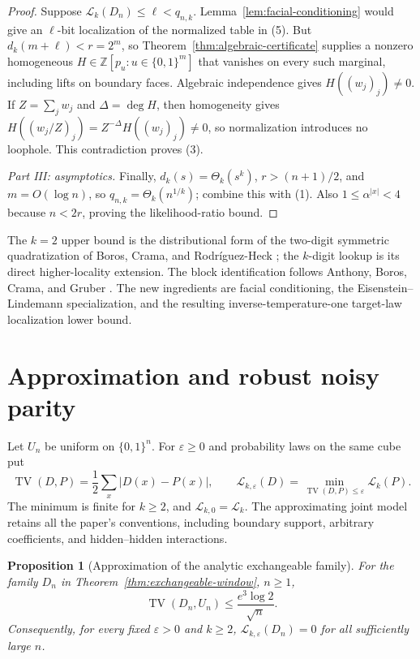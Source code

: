 \documentclass{article}
\newcommand{\LC}{\mathcal{L}}
\newcommand{\bits}{\{0,1\}}
\newtheorem{proposition}{Proposition}
\begin{document}
\begin{proof}
Suppose $\LC_k(D_n)\le\ell<q_{n,k}$.  Lemma~\ref{lem:facial-conditioning}
would give an $\ell$-bit localization of the normalized table in (5).  But
$d_k(m+\ell)<r=2^m$, so
Theorem~\ref{thm:algebraic-certificate} supplies a nonzero homogeneous
$H\in\mathbb Z[p_u:u\in\bits^m]$ that vanishes on every such marginal,
including lifts on boundary faces.  Algebraic independence gives
$H((w_j)_j)\ne0$.  If $Z=\sum_jw_j$ and $\Delta=\deg H$, then homogeneity gives
$H((w_j/Z)_j)=Z^{-\Delta}H((w_j)_j)\ne0$, so normalization introduces no
loophole.
This contradiction proves (3).

\emph{Part III: asymptotics.}
Finally, $d_k(s)=\Theta_k(s^k)$, $r>(n+1)/2$, and $m=O(\log n)$, so
$q_{n,k}=\Theta_k(n^{1/k})$; combine this with (1).  Also
$1\le\alpha^{|x|}<4$ because $n<2r$, proving the likelihood-ratio bound.
\end{proof}

The $k=2$ upper bound is the distributional form of the two-digit symmetric
quadratization of Boros, Crama, and Rodr\'iguez-Heck
\cite[Theorem~6]{bcrh20}; the $k$-digit lookup is its direct higher-locality
extension.  The block identification follows Anthony, Boros, Crama, and
Gruber \cite[Lemma~5.1]{anthony16}.  The new ingredients are facial
conditioning, the Eisenstein--Lindemann specialization, and the resulting
inverse-temperature-one target-law localization lower bound.

\section{Approximation and robust noisy parity}
\label{sec:approximation}

Let $U_n$ be uniform on $\bits^n$.  For $\varepsilon\ge0$ and probability
laws on the same cube put
\[
  \operatorname{TV}(D,P)=\frac12\sum_x|D(x)-P(x)|,
  \qquad
  \LC_{k,\varepsilon}(D)
  =\min_{\operatorname{TV}(D,P)\le\varepsilon}\LC_k(P).
\]
The minimum is finite for $k\ge2$, and $\LC_{k,0}=\LC_k$.
The approximating joint model retains all the paper's conventions, including
boundary support, arbitrary coefficients, and hidden--hidden interactions.

\begin{proposition}[Approximation of the analytic exchangeable family]
\label{prop:exchangeable-tv-collapse}
For the family $D_n$ in Theorem~\ref{thm:exchangeable-window}, $n\ge1$,
\[
  \operatorname{TV}(D_n,U_n)
  \le \frac{e^3\log 2}{\sqrt n}.
\]
Consequently, for every fixed $\varepsilon>0$ and $k\ge2$,
$\LC_{k,\varepsilon}(D_n)=0$ for all sufficiently large $n$.
\end{proposition}
\end{document}
